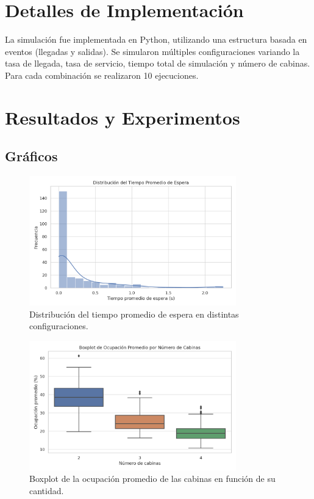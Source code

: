 \documentclass[12pt]{article}
\begin{document}
\section{Detalles de Implementación}
La simulación fue implementada en Python, utilizando una estructura basada en eventos (llegadas y salidas). Se simularon múltiples configuraciones variando la tasa de llegada, tasa de servicio, tiempo total de simulación y número de cabinas. Para cada combinación se realizaron 10 ejecuciones.

\section{Resultados y Experimentos}
\subsection*{Gráficos}
\begin{figure}[H]
\centering
\includegraphics[width=0.8\textwidth]{hist_espera.png}
\caption{Distribución del tiempo promedio de espera en distintas configuraciones.}
\end{figure}

\begin{figure}[H]
\centering
\includegraphics[width=0.8\textwidth]{box_ocupacion.png}
\caption{Boxplot de la ocupación promedio de las cabinas en función de su cantidad.}
\end{figure}
\end{document}
